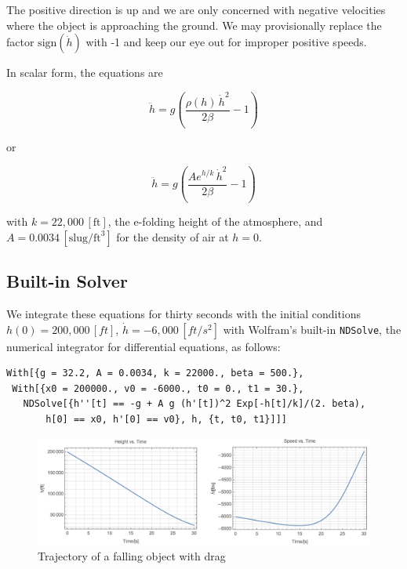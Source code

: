 \documentclass[10pt,oneside,x11names]{article}
\begin{document}
The positive direction is up and we are only concerned with negative velocities
where the object is approaching the ground. We may provisionally replace the
factor \(\textrm{sign}({\dot{h}})\) with -1 and keep our eye out for improper
positive speeds. 

In scalar form, the equations are 

\begin{equation*}
\ddot { h }
=
g\left(\frac{\rho(h)\,{{\dot{h}}^2}}{2\beta}-1\right)
\end{equation*}

\noindent or 

\begin{equation}
\label{eqn:scalar-equations-of-motion}
\ddot { h }
=
g\left(\frac{A e^{h/k}\,{{\dot{h}}^2}}{2\beta}-1\right)
\end{equation}

\noindent 
with
\(k=22,000\,\left[\textrm{ft}\right]\), the e-folding height of the atmosphere,
and \(A=0.0034\,[\textrm{slug}/{{\textrm{ft}}^3}]\) for the density of
air at \(h=0\).

\subsection{Built-in Solver}
\label{sec:orgheadline5}

We integrate these equations for thirty seconds
with  the initial conditions \(h(0)=200,000\,[ft]\), \({\dot{h}}=-6,000\,[ft/s^2]\)
with Wolfram's built-in \texttt{NDSolve}, the numerical
integrator for differential equations, as follows:

\begin{verbatim}
With[{g = 32.2, A = 0.0034, k = 22000., beta = 500.},
 With[{x0 = 200000., v0 = -6000., t0 = 0., t1 = 30.},
   NDSolve[{h''[t] == -g + A g (h'[t])^2 Exp[-h[t]/k]/(2. beta),
       h[0] == x0, h'[0] == v0}, h, {t, t0, t1}]]]
\end{verbatim}

\begin{figure}[htb]
\centering
\includegraphics[width=.9\linewidth]{NDSolveFallingWithDrag.png}
\caption{\label{fig:orgparagraph1}
Trajectory of a falling object with drag}
\end{figure}
\end{document}
